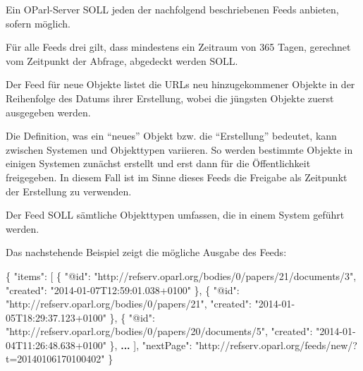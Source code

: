 \documentclass[,a4paper]{article}
\newenvironment{Shaded}{}{}
\newcommand{\DataTypeTok}[1]{\textcolor[rgb]{0.56,0.13,0.00}{{#1}}}
\newcommand{\StringTok}[1]{\textcolor[rgb]{0.25,0.44,0.63}{{#1}}}
\newcommand{\ErrorTok}[1]{\textcolor[rgb]{1.00,0.00,0.00}{\textbf{{#1}}}}
\newcommand{\NormalTok}[1]{{#1}}
\begin{document}
Ein OParl-Server SOLL jeden der nachfolgend beschriebenen Feeds
anbieten, sofern möglich.

Für alle Feeds drei gilt, dass mindestens ein Zeitraum von 365 Tagen,
gerechnet vom Zeitpunkt der Abfrage, abgedeckt werden SOLL.


Der Feed für neue Objekte listet die URLs neu hinzugekommener Objekte in
der Reihenfolge des Datums ihrer Erstellung, wobei die jüngsten Objekte
zuerst ausgegeben werden.

Die Definition, was ein ``neues'' Objekt bzw. die ``Erstellung''
bedeutet, kann zwischen Systemen und Objekttypen variieren. So werden
bestimmte Objekte in einigen Systemen zunächst erstellt und erst dann
für die Öffentlichkeit freigegeben. In diesem Fall ist im Sinne dieses
Feeds die Freigabe als Zeitpunkt der Erstellung zu verwenden.

Der Feed SOLL sämtliche Objekttypen umfassen, die in einem System
geführt werden.

Das nachstehende Beispiel zeigt die mögliche Ausgabe des Feeds:

\begin{Shaded}
\begin{Highlighting}[]
\NormalTok{\{}
    \DataTypeTok{"items"}\NormalTok{: [}
        \NormalTok{\{}
            \DataTypeTok{"@id"}\NormalTok{: }\StringTok{"http://refserv.oparl.org/bodies/0/papers/21/documents/3"}\NormalTok{,}
            \DataTypeTok{"created"}\NormalTok{: }\StringTok{"2014-01-07T12:59:01.038+0100"}
        \NormalTok{\},}
        \NormalTok{\{}
            \DataTypeTok{"@id"}\NormalTok{: }\StringTok{"http://refserv.oparl.org/bodies/0/papers/21"}\NormalTok{,}
            \DataTypeTok{"created"}\NormalTok{: }\StringTok{"2014-01-05T18:29:37.123+0100"}
        \NormalTok{\},}
        \NormalTok{\{}
            \DataTypeTok{"@id"}\NormalTok{: }\StringTok{"http://refserv.oparl.org/bodies/0/papers/20/documents/5"}\NormalTok{,}
            \DataTypeTok{"created"}\NormalTok{: }\StringTok{"2014-01-04T11:26:48.638+0100"}
        \NormalTok{\},}
        \ErrorTok{...}
    \NormalTok{],}
    \DataTypeTok{"nextPage"}\NormalTok{: }\StringTok{"http://refserv.oparl.org/feeds/new/?t=20140106170100402"}
\NormalTok{\}}
\end{Highlighting}
\end{Shaded}
\end{document}
